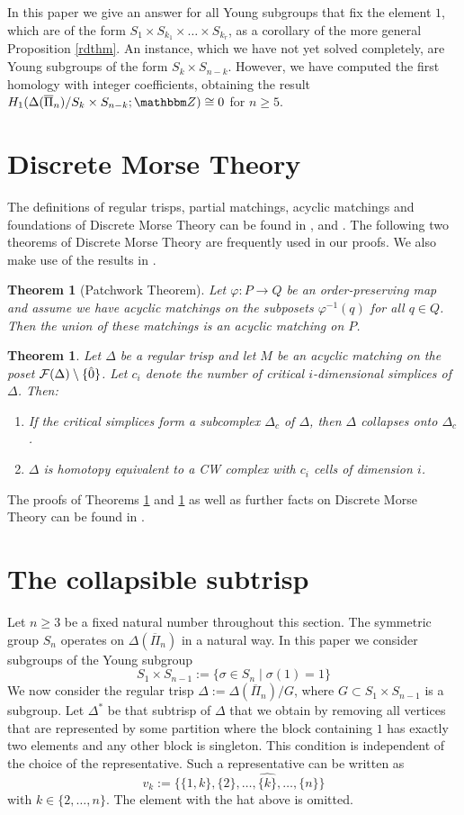\documentclass{elsarticle}
\newtheorem{thm}[df]{Theorem}
\def\Z{\mathbbm Z}
\begin{document}
In this paper we give an answer for all Young subgroups that fix the element $1$, which are of the form $S_1\times S_{k_1}\times\dots\times S_{k_r}$, as a corollary of the more general Proposition \ref{rdthm}. An instance, which we have not yet solved completely, are Young subgroups of the form $S_k\times S_{n-k}$. However, we have computed the first homology with integer coefficients, obtaining the result $H_1(\Delta(\overline{\Pi}_n)/S_k\times S_{n-k};\Z)\cong 0$ for $n\geq 5$.
\section{Discrete Morse Theory}
The definitions of regular trisps, partial matchings, acyclic matchings and foundations of Discrete Morse Theory can be found in \cite{forman}, \cite{clmap} and \cite{buch}. The following two theorems of Discrete Morse Theory are frequently used in our proofs. We also make use of the results in \cite{clmap}.
\begin{thm}[Patchwork Theorem]
\label{patchwork}
Let $\varphi:P\longrightarrow Q$ be an order-preserving map and assume we have acyclic matchings on the subposets $\varphi^{-1}(q)$ for all $q\in Q$. Then the union of these matchings is an acyclic matching on $P$.
\end{thm}
\begin{thm}%
\label{morsemain}
Let $\Delta$ be a regular trisp and let $M$ be an acyclic matching on the poset ${\cal F}(\Delta)\setminus\{\hat{0}\}$. Let $c_i$ denote the number of critical $i$-dimensional simplices of $\Delta$. Then:
\begin{enumerate}
\item If the critical simplices form a subcomplex $\Delta_c$ of $\Delta$, then $\Delta$ collapses onto $\Delta_c$.
\item $\Delta$ is homotopy equivalent to a CW complex with $c_i$ cells of dimension $i$.
\end{enumerate}
\end{thm}
The proofs of Theorems \ref{patchwork} and \ref{morsemain} as well as further facts on Discrete Morse Theory can be found in \cite[Chapter 11]{buch}.
\section{The collapsible subtrisp}
\label{allgemein}
Let $n\geq 3$ be a fixed natural number throughout this section. The symmetric group $S_n$ operates on $\Delta(\overline{\Pi}_n)$ in a natural way. In this paper we consider subgroups of the Young subgroup
\[S_1\times S_{n-1}:=\{\sigma\in S_n\mid\sigma(1)=1\}\]
We now consider the regular trisp $\Delta:=\Delta(\overline{\Pi}_n)/G$, where $G\subset S_1\times S_{n-1}$ is a subgroup. Let $\Delta^*$ be that subtrisp of $\Delta$ that we obtain by removing all vertices that are represented by some partition where the block containing $1$ has exactly two elements and any other block is singleton. This condition is independent of the choice of the representative. Such a representative can be written as
\[
v_k:=\{\{1,k\},\{2\},\dots,\widehat{\{k\}},\dots,\{n\}\}
\]
with $k\in\{2,\ldots, n\}$. The element with the hat above is omitted.
\end{document}

